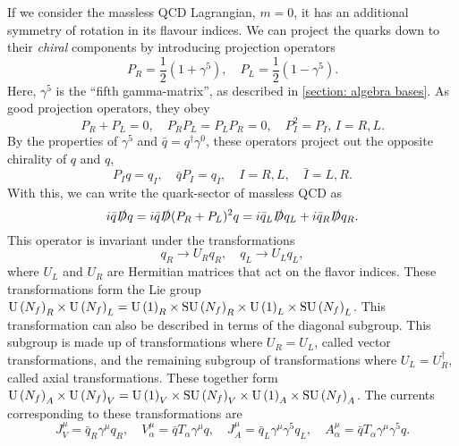 If we consider the massless QCD Lagrangian, $m = 0$, it has an additional symmetry of rotation in its flavour indices.
We can project the quarks down to their \emph{chiral} components by introducing projection operators
\begin{equation}
    P_R = \frac{1}{2}\left(1 + \gamma^5\right), \quad
    P_L = \frac{1}{2}\left(1 - \gamma^5\right).
\end{equation}
%
Here, $\gamma^5$ is the ``fifth gamma-matrix'', as described in \autoref{section: algebra bases}.
As good projection operators, they obey
%
\begin{equation}
    P_R + P_L = 0, \quad P_R P_L = P_L P_R = 0, \quad P_I^2 = P_I, \, I=R, L.
\end{equation}
%
By the properties of $\gamma^5$ and $\bar q = q^\dagger\gamma^0$, these operators project out the opposite chirality of $q$ and $q$,
%
\begin{equation}
    P_I q = q_I, \quad \bar q  P_I  = q_{\bar I},\quad
    I = R, L, \quad \bar I = L, R. 
\end{equation}
%
With this, we can write the quark-sector of massless QCD as
%
\begin{equation}
    i \bar q \slashed D q
    = i \bar q \slashed D (P_R + P_L)^2 q
    = i \bar q_L \slashed D q_L + i \bar q_R \slashed D q_R.
\end{equation}
%
This operator is invariant under the transformations
%
\begin{equation}
    q_R \rightarrow U_R q_R, \quad
    q_L \rightarrow U_L q_L,
\end{equation}
%
where $U_L$ and $U_R$ are Hermitian matrices that act on the flavor indices.
These transformations form the Lie group $\text{U}\left(N_f\right)_R \times \text{U}\left(N_f\right)_L = \text{U}\left(1\right)_R \times \text{SU}\left(N_f\right)_R \times \text{U}\left(1\right)_L \times \text{SU}\left(N_f\right)_L $.
This transformation can also be described in terms of the diagonal subgroup.
This subgroup is made up of transformations where $U_R = U_L$, called vector transformations, and the remaining subgroup of transformations where $U_L =  U_R^\dagger$, called axial transformations.
These together form $\text{U}\left(N_f\right)_A \times \text{U}\left(N_f\right)_V= \text{U}\left(1\right)_V \times \text{SU}\left(N_f\right)_V \times \text{U}\left(1\right)_A \times \text{SU}\left(N_f\right)_A $.
The currents corresponding to these transformations are
%
\begin{equation}
    \label{conserved currents qcd}
    J_V^\mu = \bar q_R \gamma^\mu q_R, \quad
    V^\mu_\alpha =  \bar q T_\alpha \gamma^\mu q, \quad
    J_A^\mu = \bar q_L \gamma^\mu \gamma^5 q_L, \quad
    A^\mu_\alpha = \bar q T_\alpha \gamma^\mu \gamma^5 q.
\end{equation}
